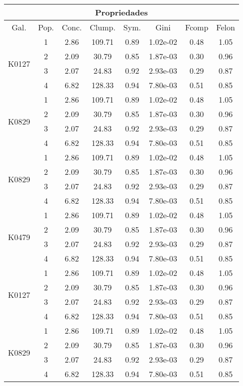 \begin{longtable}{|c|c|c|c|c|c|c|c|}
\hline
\multicolumn{8}{|c|}{Propriedades} \\
\hline
Gal. & Pop. & Conc. & Clump. & Sym. & Gini & Fcomp & Felon\\ \hline

\multirow{4}{*}{K0127} & 1 & 2.86 & 109.71 & 0.89 & 1.02e-02 & 0.48 & 1.05 \\
& 2 & 2.09 & 30.79 & 0.85 & 1.87e-03 & 0.30 & 0.96 \\
& 3 & 2.07 & 24.83 & 0.92 & 2.93e-03 & 0.29 & 0.87 \\
& 4 & 6.82 & 128.33 & 0.94 & 7.80e-03 & 0.51 & 0.85 \\ \hline

\multirow{4}{*}{K0829} & 1 & 2.86 & 109.71 & 0.89 & 1.02e-02 & 0.48 & 1.05 \\
& 2 & 2.09 & 30.79 & 0.85 & 1.87e-03 & 0.30 & 0.96 \\
& 3 & 2.07 & 24.83 & 0.92 & 2.93e-03 & 0.29 & 0.87 \\
& 4 & 6.82 & 128.33 & 0.94 & 7.80e-03 & 0.51 & 0.85 \\ \hline

\multirow{4}{*}{K0829} & 1 & 2.86 & 109.71 & 0.89 & 1.02e-02 & 0.48 & 1.05 \\
& 2 & 2.09 & 30.79 & 0.85 & 1.87e-03 & 0.30 & 0.96 \\
& 3 & 2.07 & 24.83 & 0.92 & 2.93e-03 & 0.29 & 0.87 \\
& 4 & 6.82 & 128.33 & 0.94& 7.80e-03 & 0.51 & 0.85 \\ \hline

\multirow{4}{*}{K0479} & 1 & 2.86 & 109.71 & 0.89 & 1.02e-02 & 0.48 & 1.05 \\
& 2 & 2.09 & 30.79 & 0.85 & 1.87e-03 & 0.30 & 0.96 \\
& 3 & 2.07 & 24.83 & 0.92 & 2.93e-03 & 0.29 & 0.87 \\
& 4 & 6.82 & 128.33 & 0.94& 7.80e-03 & 0.51 & 0.85 \\ \hline


\multirow{4}{*}{K0127} & 1 & 2.86 & 109.71 & 0.89 & 1.02e-02 & 0.48 & 1.05 \\
& 2 & 2.09 & 30.79 & 0.85 & 1.87e-03 & 0.30 & 0.96 \\
& 3 & 2.07 & 24.83 & 0.92 & 2.93e-03 & 0.29 & 0.87 \\
& 4 & 6.82 & 128.33 & 0.94 & 7.80e-03 & 0.51 & 0.85 \\ \hline

\multirow{4}{*}{K0829} & 1 & 2.86 & 109.71 & 0.89 & 1.02e-02 & 0.48 & 1.05 \\
& 2 & 2.09 & 30.79 & 0.85 & 1.87e-03 & 0.30 & 0.96 \\
& 3 & 2.07 & 24.83 & 0.92 & 2.93e-03 & 0.29 & 0.87 \\
& 4 & 6.82 & 128.33 & 0.94 & 7.80e-03 & 0.51 & 0.85 \\ \hline


\end{longtable}
